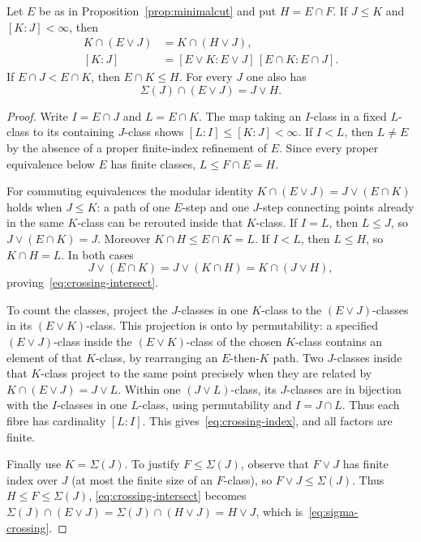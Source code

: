 \begin{lemma}\label{lem:crossingindex}
Let $E$ be as in Proposition~\ref{prop:minimalcut} and put $H=E\cap F$.
If $J\le K$ and $[K:J]<\infty$, then
\begin{align}
 K\cap(E\vee J)&=K\cap(H\vee J),\label{eq:crossing-intersect}\\
 [K:J]&=[E\vee K:E\vee J]\,[E\cap K:E\cap J].
    \label{eq:crossing-index}
\end{align}
If $E\cap J<E\cap K$, then $E\cap K\le H$.
For every $J$ one also has
\begin{equation}\label{eq:sigma-crossing}
 \Sigma(J)\cap(E\vee J)=J\vee H.
\end{equation}
\end{lemma}
\begin{proof}
Write $I=E\cap J$ and $L=E\cap K$.  The map taking an
$I$-class in a fixed $L$-class to its containing $J$-class
shows $[L:I]\le[K:J]<\infty$.
If $I<L$, then $L\ne E$ by the absence of a proper
finite-index refinement of $E$.  Since every proper equivalence
below $E$ has finite classes, $L\le F\cap E=H$.

For commuting equivalences the modular identity
$K\cap(E\vee J)=J\vee(E\cap K)$ holds when $J\le K$:
a path of one $E$-step and one $J$-step connecting points
already in the same $K$-class can be rerouted inside that
$K$-class.  If $I=L$, then $L\le J$, so
$J\vee(E\cap K)=J$.  Moreover $K\cap H\le E\cap K=L$.
If $I<L$, then $L\le H$, so $K\cap H=L$.
In both cases
\[
 J\vee(E\cap K)=J\vee(K\cap H)=K\cap(J\vee H),
\]
proving~\eqref{eq:crossing-intersect}.

To count the classes, project the $J$-classes in one $K$-class
to the $(E\vee J)$-classes in its $(E\vee K)$-class.  This
projection is onto by permutability: a specified $(E\vee J)$-class
inside the $(E\vee K)$-class of the chosen $K$-class contains
an element of that $K$-class, by rearranging an $E$-then-$K$ path.
Two $J$-classes inside that $K$-class project to the same point
precisely when they are related by $K\cap(E\vee J)=J\vee L$.
Within one $(J\vee L)$-class, its $J$-classes are in bijection
with the $I$-classes in one $L$-class, using permutability
and $I=J\cap L$.  Thus each fibre has cardinality $[L:I]$.
This gives~\eqref{eq:crossing-index}, and all factors are finite.

Finally use $K=\Sigma(J)$.  To justify $F\le\Sigma(J)$,
observe that $F\vee J$ has finite index over $J$ (at most the
finite size of an $F$-class), so $F\vee J\le\Sigma(J)$.
Thus $H\le F\le\Sigma(J)$, 
\eqref{eq:crossing-intersect} becomes
$\Sigma(J)\cap(E\vee J)=\Sigma(J)\cap(H\vee J)=H\vee J$,
which is~\eqref{eq:sigma-crossing}.
\end{proof}

